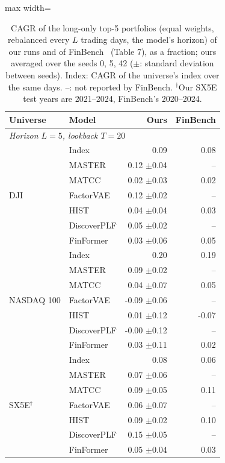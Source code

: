 \begin{table}[tb]
\centering
\caption{CAGR of the long-only top-5 portfolios (equal weights, rebalanced every $L$ trading days, the model's horizon) of our runs and of FinBench~\cite{pederzoli2026finbench} (Table 7), as a fraction; ours averaged over the seeds 0, 5, 42 ($\pm$: standard deviation between seeds). Index: CAGR of the universe's index over the same days. --: not reported by FinBench. $^\dagger$Our SX5E test years are 2021--2024, FinBench's 2020--2024.}
\begin{adjustbox}{max width=\textwidth}
{\normalsize
\setlength{\tabcolsep}{6pt}

\begin{tabular}{llrr}
\toprule
\textbf{Universe} & \textbf{Model} & \textbf{Ours} & \textbf{FinBench} \\
\midrule
\multicolumn{4}{l}{\textit{Horizon $L=5$, lookback $T=20$}} \\
\multirow{7}{*}{DJI} & Index & 0.09 & 0.08 \\
 & MASTER & 0.12 {\scriptsize$\pm$0.04} & -- \\
 & MATCC & 0.02 {\scriptsize$\pm$0.03} & 0.02 \\
 & FactorVAE & 0.12 {\scriptsize$\pm$0.02} & -- \\
 & HIST & 0.04 {\scriptsize$\pm$0.04} & 0.03 \\
 & DiscoverPLF & 0.05 {\scriptsize$\pm$0.02} & -- \\
 & FinFormer & 0.03 {\scriptsize$\pm$0.06} & 0.05 \\
\midrule
\multirow{7}{*}{NASDAQ 100} & Index & 0.20 & 0.19 \\
 & MASTER & 0.09 {\scriptsize$\pm$0.02} & -- \\
 & MATCC & 0.04 {\scriptsize$\pm$0.07} & 0.05 \\
 & FactorVAE & -0.09 {\scriptsize$\pm$0.06} & -- \\
 & HIST & 0.01 {\scriptsize$\pm$0.12} & -0.07 \\
 & DiscoverPLF & -0.00 {\scriptsize$\pm$0.12} & -- \\
 & FinFormer & 0.03 {\scriptsize$\pm$0.11} & 0.02 \\
\midrule
\multirow{7}{*}{SX5E$^\dagger$} & Index & 0.08 & 0.06 \\
 & MASTER & 0.07 {\scriptsize$\pm$0.06} & -- \\
 & MATCC & 0.09 {\scriptsize$\pm$0.05} & 0.11 \\
 & FactorVAE & 0.06 {\scriptsize$\pm$0.07} & -- \\
 & HIST & 0.09 {\scriptsize$\pm$0.02} & 0.10 \\
 & DiscoverPLF & 0.15 {\scriptsize$\pm$0.05} & -- \\
 & FinFormer & 0.05 {\scriptsize$\pm$0.04} & 0.03 \\
\bottomrule
\end{tabular}
}
\end{adjustbox}
\label{tab:finbench_portfolio}
\end{table}
